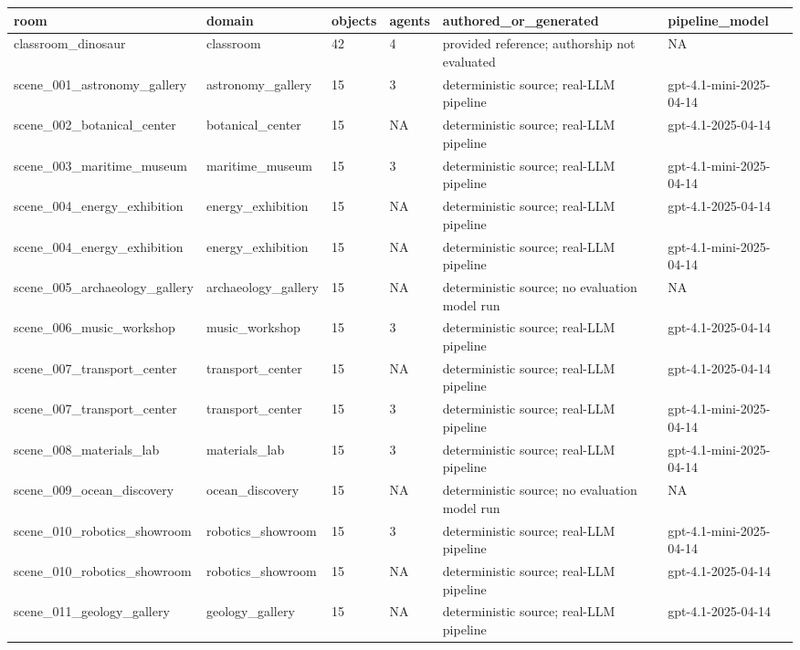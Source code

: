 \begin{tabular}{llllll}
\toprule
room & domain & objects & agents & authored\_or\_generated & pipeline\_model \\
\midrule
classroom\_dinosaur & classroom & 42 & 4 & provided reference; authorship not evaluated & NA \\
scene\_001\_astronomy\_gallery & astronomy\_gallery & 15 & 3 & deterministic source; real-LLM pipeline & gpt-4.1-mini-2025-04-14 \\
scene\_002\_botanical\_center & botanical\_center & 15 & NA & deterministic source; real-LLM pipeline & gpt-4.1-2025-04-14 \\
scene\_003\_maritime\_museum & maritime\_museum & 15 & 3 & deterministic source; real-LLM pipeline & gpt-4.1-mini-2025-04-14 \\
scene\_004\_energy\_exhibition & energy\_exhibition & 15 & NA & deterministic source; real-LLM pipeline & gpt-4.1-2025-04-14 \\
scene\_004\_energy\_exhibition & energy\_exhibition & 15 & NA & deterministic source; real-LLM pipeline & gpt-4.1-mini-2025-04-14 \\
scene\_005\_archaeology\_gallery & archaeology\_gallery & 15 & NA & deterministic source; no evaluation model run & NA \\
scene\_006\_music\_workshop & music\_workshop & 15 & 3 & deterministic source; real-LLM pipeline & gpt-4.1-2025-04-14 \\
scene\_007\_transport\_center & transport\_center & 15 & NA & deterministic source; real-LLM pipeline & gpt-4.1-2025-04-14 \\
scene\_007\_transport\_center & transport\_center & 15 & 3 & deterministic source; real-LLM pipeline & gpt-4.1-mini-2025-04-14 \\
scene\_008\_materials\_lab & materials\_lab & 15 & 3 & deterministic source; real-LLM pipeline & gpt-4.1-mini-2025-04-14 \\
scene\_009\_ocean\_discovery & ocean\_discovery & 15 & NA & deterministic source; no evaluation model run & NA \\
scene\_010\_robotics\_showroom & robotics\_showroom & 15 & 3 & deterministic source; real-LLM pipeline & gpt-4.1-mini-2025-04-14 \\
scene\_010\_robotics\_showroom & robotics\_showroom & 15 & NA & deterministic source; real-LLM pipeline & gpt-4.1-2025-04-14 \\
scene\_011\_geology\_gallery & geology\_gallery & 15 & NA & deterministic source; real-LLM pipeline & gpt-4.1-2025-04-14 \\

\end{tabular}
